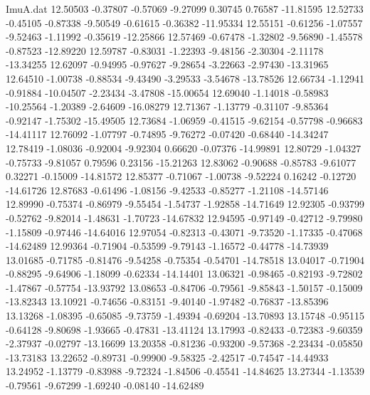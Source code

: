 \begin{filecontents}{ImuA.dat}
  12.50503   -0.37807   -0.57069   -9.27099    0.30745    0.76587  -11.81595
  12.52733   -0.45105   -0.87338   -9.50549   -0.61615   -0.36382  -11.95334
  12.55151   -0.61256   -1.07557   -9.52463   -1.11992   -0.35619  -12.25866
  12.57469   -0.67478   -1.32802   -9.56890   -1.45578   -0.87523  -12.89220
  12.59787   -0.83031   -1.22393   -9.48156   -2.30304   -2.11178  -13.34255
  12.62097   -0.94995   -0.97627   -9.28654   -3.22663   -2.97430  -13.31965
  12.64510   -1.00738   -0.88534   -9.43490   -3.29533   -3.54678  -13.78526
  12.66734   -1.12941   -0.91884  -10.04507   -2.23434   -3.47808  -15.00654
  12.69040   -1.14018   -0.58983  -10.25564   -1.20389   -2.64609  -16.08279
  12.71367   -1.13779   -0.31107   -9.85364   -0.92147   -1.75302  -15.49505
  12.73684   -1.06959   -0.41515   -9.62154   -0.57798   -0.96683  -14.41117
  12.76092   -1.07797   -0.74895   -9.76272   -0.07420   -0.68440  -14.34247
  12.78419   -1.08036   -0.92004   -9.92304    0.66620   -0.07376  -14.99891
  12.80729   -1.04327   -0.75733   -9.81057    0.79596    0.23156  -15.21263
  12.83062   -0.90688   -0.85783   -9.61077    0.32271   -0.15009  -14.81572
  12.85377   -0.71067   -1.00738   -9.52224    0.16242   -0.12720  -14.61726
  12.87683   -0.61496   -1.08156   -9.42533   -0.85277   -1.21108  -14.57146
  12.89990   -0.75374   -0.86979   -9.55454   -1.54737   -1.92858  -14.71649
  12.92305   -0.93799   -0.52762   -9.82014   -1.48631   -1.70723  -14.67832
  12.94595   -0.97149   -0.42712   -9.79980   -1.15809   -0.97446  -14.64016
  12.97054   -0.82313   -0.43071   -9.73520   -1.17335   -0.47068  -14.62489
  12.99364   -0.71904   -0.53599   -9.79143   -1.16572   -0.44778  -14.73939
  13.01685   -0.71785   -0.81476   -9.54258   -0.75354   -0.54701  -14.78518
  13.04017   -0.71904   -0.88295   -9.64906   -1.18099   -0.62334  -14.14401
  13.06321   -0.98465   -0.82193   -9.72802   -1.47867   -0.57754  -13.93792
  13.08653   -0.84706   -0.79561   -9.85843   -1.50157   -0.15009  -13.82343
  13.10921   -0.74656   -0.83151   -9.40140   -1.97482   -0.76837  -13.85396
  13.13268   -1.08395   -0.65085   -9.73759   -1.49394   -0.69204  -13.70893
  13.15748   -0.95115   -0.64128   -9.80698   -1.93665   -0.47831  -13.41124
  13.17993   -0.82433   -0.72383   -9.60359   -2.37937   -0.02797  -13.16699
  13.20358   -0.81236   -0.93200   -9.57368   -2.23434   -0.05850  -13.73183
  13.22652   -0.89731   -0.99900   -9.58325   -2.42517   -0.74547  -14.44933
  13.24952   -1.13779   -0.83988   -9.72324   -1.84506   -0.45541  -14.84625
  13.27344   -1.13539   -0.79561   -9.67299   -1.69240   -0.08140  -14.62489

\end{filecontents}
